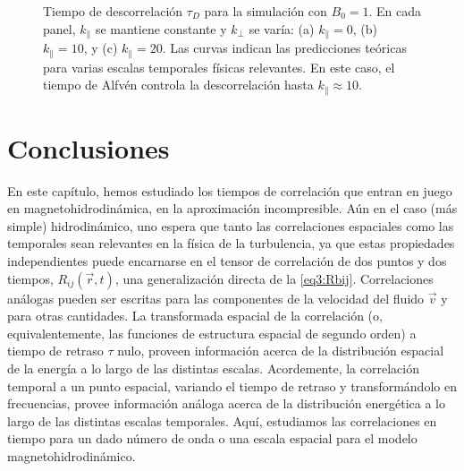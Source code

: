 \begin{figure}
  \centering

  \caption{Tiempo de descorrelación $\tau_D$ para la simulación con
    $B_0=1$. En cada panel, $k_\parallel$ se mantiene constante y
    $k_\perp$ se varía: (a) $k_\parallel = 0$, (b) $k_\parallel = 10$,
    y (c) $k_\parallel = 20$. Las curvas indican las predicciones teóricas
    para varias escalas temporales físicas relevantes. En este caso,
    el tiempo de Alfv\'en controla la descorrelación hasta $k_\parallel \approx 10$.}
  \label{fig3-5:B8_bvf_b_kpara}
\end{figure}


\section{Conclusiones}\label{sec3:Conclusions}
En este capítulo, hemos estudiado los tiempos de correlación que entran
en juego en magnetohidrodinámica, en la aproximación
incompresible. Aún en el caso (más simple) hidrodinámico, uno espera
que tanto las correlaciones espaciales como las temporales sean
relevantes en la física de la turbulencia, ya que estas propiedades
independientes puede encarnarse en el tensor de correlación de dos
puntos y dos tiempos, $R_{ij}(\vec{r},t)$, una generalización directa
de la \cref{eq3:Rbij}. Correlaciones análogas pueden ser escritas para
las componentes de la velocidad del fluido $\vec{v}$ y para otras
cantidades. La transformada espacial de la correlación (o,
equivalentemente, las funciones de estructura espacial de segundo
orden) a tiempo de retraso $\tau$ nulo, proveen información acerca de
la distribución espacial de la energía a lo largo de las distintas
escalas. Acordemente, la correlación temporal a un punto espacial, variando
el tiempo de retraso y transformándolo en frecuencias, provee
información análoga acerca de la distribución energética a lo largo de
las distintas escalas temporales. Aquí, estudiamos las correlaciones
en tiempo para un dado número de onda o una escala espacial para el
modelo magnetohidrodinámico.

